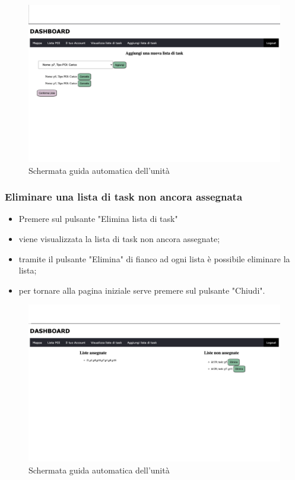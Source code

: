 \begin{figure}[H]
    \centering
    \includegraphics[scale=0.12]{res/images/newtask_manager.png}
    \caption{Schermata guida automatica dell'unità}
\end{figure}

\subsubsection{Eliminare una lista di task non ancora assegnata}
\begin{itemize}
    \item Premere sul pulsante "Elimina lista di task"
    \item viene visualizzata la lista di task non ancora assegnate;
    \item tramite il pulsante "Elimina" di fianco ad ogni lista è possibile eliminare la lista;
    \item per tornare alla pagina iniziale serve premere sul pulsante "Chiudi".
\end{itemize}
\begin{figure}[H]
    \centering
    \includegraphics[scale=0.12]{res/images/task_manager.png}
    \caption{Schermata guida automatica dell'unità}
\end{figure}